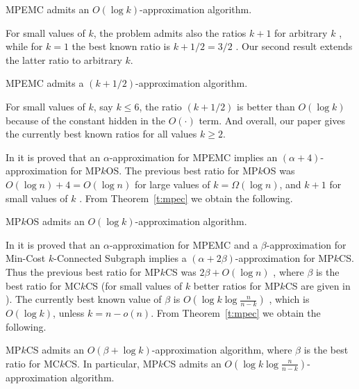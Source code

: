 \documentclass{llncs}
\begin{document}
\begin{theorem} \label{t:mpec}
{\sf MPEMC} admits an $O(\log k)$-approximation algorithm.
\end{theorem}

For small values of $k$, the problem admits also the ratios $k+1$
for arbitrary $k$ \cite{HKMN}, while for $k=1$ the best known ratio is $k+1/2=3/2$ \cite{KN-cov}. 
Our second result extends the latter ratio to arbitrary $k$.

\begin{theorem} \label{t:mpec'}
{\sf MPEMC} admits a $(k+1/2)$-approximation algorithm.
\end{theorem}

For small values of $k$, say $k \leq 6$, the ratio $(k+1/2)$ is better than
$O(\log k)$ because of the constant hidden in the $O( \cdot)$ term.
And overall, our paper gives the currently best known ratios for all values $k \geq 2$.

\vspace*{0.1cm}

In \cite{LYN} it is proved that an $\alpha$-approximation for {\sf MPEMC} implies an 
$(\alpha+4)$-approximation for {\sf MP$k$OS}.
The previous best ratio for {\sf MP$k$OS}  was 
$O(\log n)+4=O(\log n)$ \cite{LYN} for large values of $k=\Omega(\log n)$, 
and $k+1$ for small values of $k$ \cite{zeev-p}.
From Theorem~\ref{t:mpec} we obtain the following.

\begin{theorem} \label{c:mpoc}
{\sf MP$k$OS} admits an $O(\log k)$-approximation algorithm.
\end{theorem}

In \cite{HKMN} it is proved that an $\alpha$-approximation for {\sf MPEMC}
and a $\beta$-approximation for {\sf Min-Cost $k$-Connected Subgraph} implies a 
$(\alpha+2\beta)$-approximation for {\sf MP$k$CS}.
Thus the previous best ratio for {\sf MP$k$CS} was
$2\beta+O(\log n)$ \cite{KMNT}, where $\beta$ is the best ratio for {\sf MC$k$CS}
(for small values of $k$ better ratios for {\sf MP$k$CS} are given in \cite{zeev-p}).
The currently best known value of $\beta$ is $O\left(\log k \log \frac{n}{n-k} \right)$ \cite{zeevnew},
which is $O(\log k)$, unless $k=n-o(n)$.
From Theorem~\ref{t:mpec} we obtain the following.

\begin{theorem} \label{c:mpkc}
{\sf MP$k$CS} admits an $O(\beta+\log k)$-approximation algorithm,
where $\beta$ is the best ratio for {\sf MC$k$CS}. 
In particular, {\sf MP$k$CS} admits an $O\left(\log k \log \frac{n}{n-k} \right)$-approximation algorithm.
\end{theorem}
\end{document}

